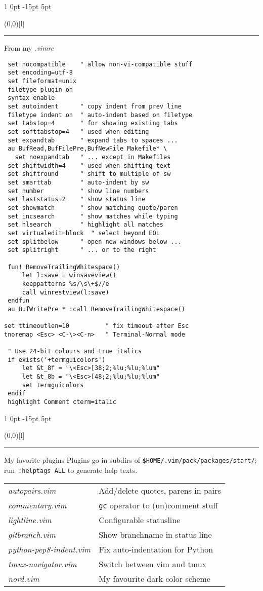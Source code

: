 \documentclass[a4paper, landscape, 10pt]{article}
\makeatletter
\newlength{\shift}
\renewcommand{\section}{%
    \@startsection{section}%
        {1}%
        {0pt}%
        {-15pt}%
        {5pt}%
        {\protect\makebox(0,0)[l]{\color{accentcolor!80}\rule[8pt]{\columnwidth}{19pt}}\hspace{.5em}\fontsize{14pt}{12pt}\fontseries{ub}\selectfont\color{white}}}
\newcommand{\V}[1]{\texttt{\textup{#1}}}
\makeatother
\begin{document}
\begin{multicols*}{3}
\section{From my \textit{.vimrc}}
\begin{verbatim}
 set nocompatible    " allow non-vi-compatible stuff
 set encoding=utf-8
 set fileformat=unix
 filetype plugin on
 syntax enable
 set autoindent      " copy indent from prev line
 filetype indent on  " auto-indent based on filetype
 set tabstop=4       " for showing existing tabs
 set softtabstop=4   " used when editing
 set expandtab       " expand tabs to spaces ...
 au BufRead,BufFilePre,BufNewFile Makefile* \
   set noexpandtab   " ... except in Makefiles
 set shiftwidth=4    " used when shifting text
 set shiftround      " shift to multiple of sw
 set smarttab        " auto-indent by sw
 set number          " show line numbers
 set laststatus=2    " show status line
 set showmatch       " show matching quote/paren
 set incsearch       " show matches while typing
 set hlsearch        " highlight all matches
 set virtualedit=block  " select beyond EOL
 set splitbelow      " open new windows below ...
 set splitright      " ... or to the right

 fun! RemoveTrailingWhitespace()
     let l:save = winsaveview()
     keeppatterns %s/\s\+$//e
     call winrestview(l:save)
 endfun
 au BufWritePre * :call RemoveTrailingWhitespace()

set ttimeoutlen=10          " fix timeout after Esc
tnoremap <Esc> <C-\><C-n>   " Terminal-Normal mode

 " Use 24-bit colours and true italics
 if exists('+termguicolors')
     let &t_8f = "\<Esc>[38;2;%lu;%lu;%lum"
     let &t_8b = "\<Esc>[48;2;%lu;%lu;%lum"
     set termguicolors
 endif
 highlight Comment cterm=italic
\end{verbatim}

\columnbreak



\section{My favorite plugins}
Plugins go in subdirs of \verb|$HOME/.vim/pack/packages/start/|; run~\V{:helptags ALL} to generate help texts.
\vspace{.5\baselineskip}

    \begin{tabularx}{\columnwidth}{>{\itshape}l>{\raggedright\arraybackslash}X}
autopairs.vim           &Add/delete quotes, parens in pairs\\
commentary.vim          &\V{gc} operator to (un)comment stuff\\
lightline.vim           &Configurable statusline\\
gitbranch.vim           &Show branchname in status line\\
python-pep8-indent.vim  &Fix auto-indentation for Python\\
tmux-navigator.vim      &Switch between vim and tmux\\
nord.vim                &My favourite dark color scheme
    \end{tabularx}


\end{multicols*}
\end{document}
